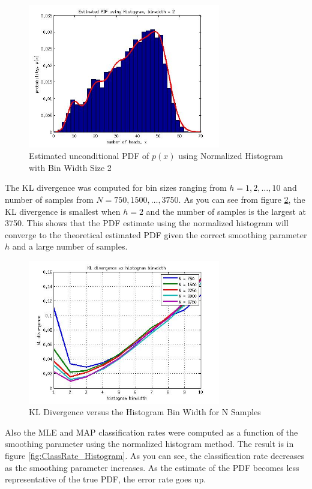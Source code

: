 \documentclass[journal]{IEEEtran}
\begin{document}
\begin{figure}[h]
\centering
\includegraphics[width=3.3in]{../images/PDF_Histogram.jpg}
\caption{Estimated unconditional PDF of \(p(x)\) using Normalized Histogram with Bin Width Size 2}
\label{fig:PDF_Histogram}
\end{figure}

\par The KL divergence was computed for bin sizes ranging from \(h = 1, 2, \ldots, 10\) and number of samples from \(N = 750, 1500,\ldots, 3750\). As you can see from figure \ref{fig:KL_Histogram}, the KL divergence is smallest when \(h = 2\) and the number of samples is the largest at 3750. This shows that the PDF estimate using the normalized histogram will converge to the theoretical estimated PDF given the correct smoothing parameter \(h\) and a large number of samples.

\begin{figure}[h]
\centering
\includegraphics[width=3.3in]{../images/KL_Histogram.jpg}
\caption{KL Divergence versus the Histogram Bin Width for N Samples}
\label{fig:KL_Histogram}
\end{figure}

\par Also the MLE and MAP classification rates were computed as a function of the smoothing parameter using the normalized histogram method. The result is in figure \ref{fig:ClassRate_Histogram}. As you can see, the classification rate decreases as the smoothing parameter increases. As the estimate of the PDF becomes less representative of the true PDF, the error rate goes up.
\end{document}
